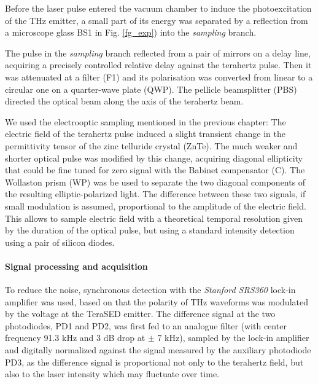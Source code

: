 Before the laser pulse entered the vacuum chamber to induce the photoexcitation of the THz emitter, a small part of its energy was separated by a reflection from a microscope glass BS1 in Fig. \ref{fg_exp}) into the \textit{sampling} branch. 

The pulse in the \textit{sampling} branch reflected from a pair of mirrors on a delay line, acquiring a precisely controlled relative delay against the terahertz pulse. Then it was attenuated at a filter (F1) and its polarisation was converted from linear to a circular one on a quarter-wave plate (QWP). The pellicle beamsplitter (PBS) directed the optical beam along the axis of the terahertz beam. 

We used the electrooptic sampling mentioned in the previous chapter: The electric field of the terahertz pulse induced a slight transient change in the permittivity tensor of the zinc telluride crystal (ZnTe). The much weaker and shorter optical pulse was modified by this change, acquiring diagonal ellipticity that could be fine tuned for zero signal with the Babinet compensator (C). The Wollaston prism (WP) was be used to separate the two diagonal components of the resulting elliptic-polarized light. The difference between these two signals, if small modulation is assumed, proportional to the amplitude of the electric field. This allows to sample electric field with a theoretical temporal resolution given by the duration of the optical pulse, but using a standard intensity detection using a pair of silicon diodes.   

\paragraph{Signal processing and acquisition}%
To reduce the noise, synchronous detection with the \textit{Stanford SRS360} lock-in amplifier was used, based on that the polarity of THz waveforms was modulated by the voltage at the TeraSED emitter. The difference signal at the two photodiodes, PD1 and PD2, was first fed to an analogue filter (with center frequency 91.3 kHz and 3 dB drop at $\pm$ 7 kHz), sampled by the lock-in amplifier and digitally normalized against the signal measured by the auxiliary photodiode PD3, as the difference signal is proportional not only to the terahertz field, but also to the laser intensity which may fluctuate over time. 

